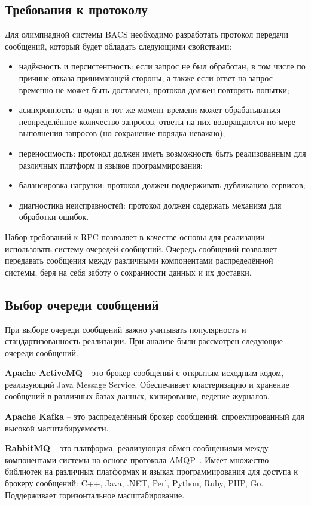 \subsection{Требования к протоколу}
Для олимпиадной системы BACS необходимо разработать протокол передачи сообщений,
который будет обладать следующими свойствами:
\begin{itemize}
    \item надёжность и персистентность:
        если запрос не был обработан, в том числе по причине отказа
        принимающей стороны, а также если ответ на запрос временно
        не может быть доставлен, протокол должен повторять попытки;
    \item асинхронность: в один и тот же момент времени может обрабатываться
        неопределённое количество запросов, ответы на них возвращаются
        по мере выполнения запросов (но сохранение порядка неважно);
    \item переносимость: протокол должен иметь возможность быть реализованным
        для различных платформ и языков программирования;
    \item балансировка нагрузки: протокол должен поддерживать дубликацию
        сервисов;
    \item диагностика неисправностей: протокол должен содержать механизм
        для обработки ошибок.
\end{itemize}

Набор требований к RPC позволяет в качестве основы для реализации использовать
систему очередей сообщений. Очередь сообщений позволяет передавать
сообщения между различными компонентами распределённой системы, беря на себя
заботу о сохранности данных и их доставки.

\subsection{Выбор очереди сообщений}
При выборе очереди сообщений важно учитывать популярность и стандартизованность
реализации. При анализе были рассмотрен следующие очереди сообщений.

\textbf{Apache ActiveMQ} -- это брокер сообщений с открытым исходным кодом,
реализующий Java Message Service. Обеспечивает кластеризацию и хранение
сообщений в различных базах данных, кэширование, ведение журналов.

\textbf{Apache Kafka} -- это распределённый брокер сообщений, спроектированный
для высокой масштабируемости.

\textbf{RabbitMQ} -- это платформа, реализующая обмен сообщениями между
компонентами системы на основе протокола AMQP~\cite{amqp}.
Имеет множество библиотек на различных платформах и языках программирования
для доступа к брокеру сообщений: C++, Java, .NET, Perl, Python, Ruby, PHP, Go.
Поддерживает горизонтальное масштабирование.

